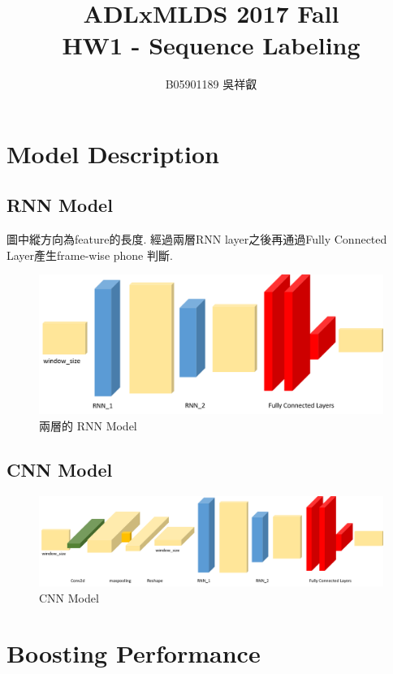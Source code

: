 \documentclass[12pt, a4paper]{article}
\title{ADLxMLDS 2017 Fall\\HW1 - Sequence Labeling}
\author{B05901189 吳祥叡}
\begin{document}
	{\let\newpage\relax\maketitle}
	\section{Model Description}
		\subsection{RNN Model}
			圖中縱方向為feature的長度.
			經過兩層RNN layer之後再通過Fully Connected Layer產生frame-wise phone 判斷.
			\begin{figure}[h]
				\includegraphics[width=\linewidth]{2LayerLSTM.png}
				\caption{兩層的 RNN Model}
			\end{figure}
		\subsection{CNN Model}		
			\begin{figure}[h!]
				\includegraphics[width=\linewidth]{CNN_model.png}
				\caption{CNN Model}
			\end{figure}
			
	\section{Boosting Performance}
\end{document}
